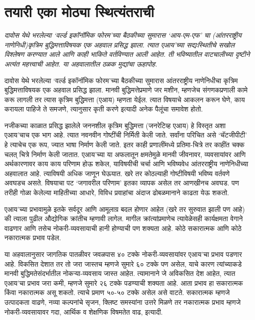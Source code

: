 \chapter{तयारी एका मोठ्या स्थित्यंतराची }

{\textit{दावोस येथे भरलेल्या `वर्ल्ड इकॉनॉमिक फोरम'च्या बैठकीच्या सुमारास `आय-एम-एफ' चा (आंतरराष्ट्रीय नाणेनिधी)कृत्रिम बुद्धिमत्ताविषयक एक अहवाल प्रसिद्ध झाला. त्यात एआय'च्या सद्यःस्थितीचे सखोल विश्लेषण करण्यात आले आणि काही भाकिते वर्तविण्यात आली आहेत. ती भविष्यातील वाटचालीच्या दृष्टीने अत्यंत महत्त्वाची आहेत. या अहवालातील ठळक मुद्यांचा ऊहापोह.}}

\vspace{1.5em}

दावोस येथे भरलेल्या `वर्ल्ड इकॉनॉमिक फोरम'च्या बैठकीच्या सुमारास आंतरराष्ट्रीय नाणेनिधीचा कृत्रिम बुद्धिमत्ताविषयक एक अहवाल प्रसिद्ध झाला. मानवी बुद्धिमत्तेप्रमाणे जर मशीन, म्हणजेच संगणकप्रणाली कामे करू लागली तर त्यास कृत्रिम बुद्धिमत्ता (एआय) म्हणता येईल. त्यात विषयाचे आकलन करून घेणे, काय करायला पाहिजे ते समजणे, त्यानुसार कृती करणे इत्यादी अनेक पैलूंचा समावेश होतो.

नजीकच्या काळात प्रसिद्ध झालेले जननशील कृत्रिम बुद्धिमत्ता (जनरेटिव्ह एआय) हे विस्तृत अशा एआय'चाच एक भाग आहे. त्यात नवनवीन गोष्टींची निर्मिती केली जाते. सर्वांना परिचित असे `चॅटजीपीटी' हे त्याचेच एक रूप, ज्यात भाषा निर्माण केली जाते. इतर काही प्रणालींमध्ये प्रतिमा-चित्रे तर काहींत चक्क चलत् चित्रे निर्माण केली जातात. एआय'च्या या अफलातून क्षमतेमुळे मानवी जीवनावर, व्यवसायांवर आणि अर्थकारणावर काय काय परिणाम होऊ शकेल, याविषयीची चर्चा आणि भविष्यवेध आंतरराष्ट्रीय नाणेनिधीच्या अहवालात आहे. त्याविषयी अधिक जाणून घेऊयात. खरे तर कोठल्याही गोष्टीविषयी भविष्य वर्तवणे अवघडच असते. विषयाचा पट `जगावरील परिणाम' इतका व्यापक असेल तर आणखीनच अवघड. पण तरीही गोळा केलेल्या माहितीच्या आधारे, विविध प्रवाहांचा अंदाज ढोबळमानाने काढता येऊ शकतो.

एआय'च्या प्रभावामुळे इतके सर्वदूर आणि आमूलाग्र बदल होणार आहेत (खरे तर सुरुवात झाली पण आहे) की त्याला पुढील औद्योगिक क्रांतीच म्हणावी लागेल. मागील क्रांत्यांप्रमाणेच त्यावेळेसही कार्यक्षमता वेगाने वाढणार आणि तसेच नोकरी-व्यवसायाची हानी होण्याची पण शक्यता आहे. कोठे सकारात्मक आणि कोठे नकारात्मक प्रभाव पडेल.

या अहवालानुसार जागतिक पातळीवर जवळपास ४० टक्के नोकरी-व्यवसायांवर एआय'चा प्रभाव पडणार आहे. विकसित देशात तर तो जरा जास्तच म्हणजे सुमारे ६० टक्के पण असेल, याचे कारण त्यांच्याकडे मानवी बुद्धिमतेसंदर्भातील नोकऱ्या-व्यवसाय जास्त आहेत. त्यामानाने जे अविकसित देश आहेत, त्यात एआय'चा प्रभाव जरा कमी, म्हणजे सुमारे २६ टक्के पडण्याची शक्यता आहे. आता प्रभाव हा सकारात्मक किंवा नकारात्मक असू शकतो. त्याचे प्रमाण ५०-५० टक्के असेल असे वाटते. सकारात्मक म्हणजे उत्पादकता वाढणे, नव्या कल्पनांचे सृजन, क्लिष्ट समस्यांना उत्तरे मिळणे तर नकारात्मक प्रभाव म्हणजे नोकरी-व्यवसायावर गदा, आर्थिक व शेक्षणिक विषमतेत वाढ, इत्यादी.

